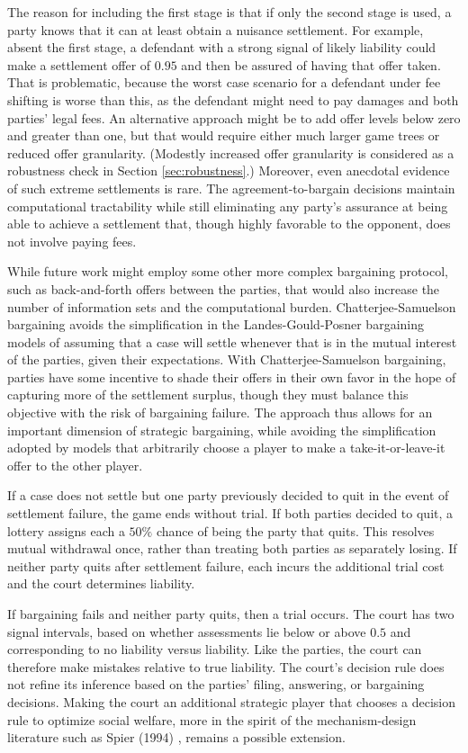 \documentclass{article}
\begin{document}
The reason for including the first stage is that if only the second stage is used, a party knows that it can at least obtain a nuisance settlement. For example, absent the first stage, a defendant with a strong signal of likely liability could make a settlement offer of $0.95$ and then be assured of having that offer taken. That is problematic, because the worst case scenario for a defendant under fee shifting is worse than this, as the defendant might need to pay damages and both parties' legal fees. An alternative approach might be to add offer levels below zero and greater than one, but that would require either much larger game trees or reduced offer granularity. (Modestly increased offer granularity is considered as a robustness check in Section \ref{sec:robustness}.) Moreover, even anecdotal evidence of such extreme settlements is rare. The agreement-to-bargain decisions maintain computational tractability while still eliminating any party's assurance at being able to achieve a settlement that, though highly favorable to the opponent, does not involve paying fees.

While future work might employ some other more complex bargaining protocol, such as back-and-forth offers between the parties, that would also increase the number of information sets and the computational burden. Chatterjee-Samuelson bargaining avoids the simplification in the Landes-Gould-Posner bargaining models of assuming that a case will settle whenever that is in the mutual interest of the parties, given their expectations. With Chatterjee-Samuelson bargaining, parties have some incentive to shade their offers in their own favor in the hope of capturing more of the settlement surplus, though they must balance this objective with the risk of bargaining failure. The approach thus allows for an important dimension of strategic bargaining, while avoiding the simplification adopted by models that arbitrarily choose a player to make a take-it-or-leave-it offer to the other player.

If a case does not settle but one party previously decided to quit in the event of settlement failure, the game ends without trial. If both parties decided to quit, a lottery assigns each a $50\%$ chance of being the party that quits. This resolves mutual withdrawal once, rather than treating both parties as separately losing.  If neither party quits after settlement failure, each incurs the additional trial cost and the court determines liability.

If bargaining fails and neither party quits, then a trial occurs. The court has two signal intervals, based on whether assessments lie below or above $0.5$ and corresponding to no liability versus liability. Like the parties, the court can therefore make mistakes relative to true liability. The court's decision rule does not refine its inference based on the parties' filing, answering, or bargaining decisions. Making the court an additional strategic player that chooses a decision rule to optimize social welfare, more in the spirit of the mechanism-design literature such as Spier (1994) \cite{spier}, remains a possible extension.
\end{document}
